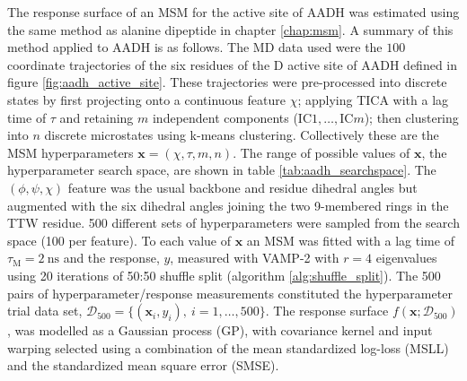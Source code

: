 The response surface of an MSM for the active site of AADH was estimated using the same method as alanine dipeptide in chapter \ref{chap:msm}. A summary of this method applied to AADH is as follows. The MD data used were the $100$ coordinate trajectories of the six residues of the D active site of AADH defined in figure \ref{fig:aadh_active_site}. These trajectories were pre-processed into discrete states by first projecting onto a continuous feature $\chi$; applying TICA with a lag time of $\tau$ and retaining $m$ independent components ($\mathrm{IC}1, \ldots, \mathrm{IC}m$);  then clustering into $n$ discrete microstates using k-means clustering. Collectively these are the MSM hyperparameters $\mathbf{x} = (\chi, \tau, m, n)$. The range of possible values of $\mathbf{x}$, the hyperparameter search space, are shown in table \ref{tab:aadh_searchspace}. The $(\phi, \psi, \chi)$ feature  was the usual backbone and residue dihedral angles but augmented with the six dihedral angles joining the two \num{9}-membered rings in the TTW residue. \num{500} different sets of hyperparameters were sampled from the search space (\num{100} per feature). To each value of $\mathbf{x}$ an MSM was fitted with a lag time of $\tau_{\mathrm{M}} = \SI{2}{\nano\second}$ and the response, $y$, measured with VAMP-2 with $r=4$ eigenvalues using 20 iterations of 50:50 shuffle split (algorithm \ref{alg:shuffle_split}). The \num{500} pairs of hyperparameter/response measurements  constituted the hyperparameter trial data set, $\mathcal{D}_{500} = \{(\mathbf{x}_{i}, y_{i}),\ i = 1, \ldots, 500\}$. The response surface $f(\mathbf{x}; \mathcal{D}_{500})$, was modelled as a Gaussian process (GP), with covariance kernel and input warping selected using a combination of the mean standardized log-loss (MSLL) and the standardized mean square error (SMSE). 

